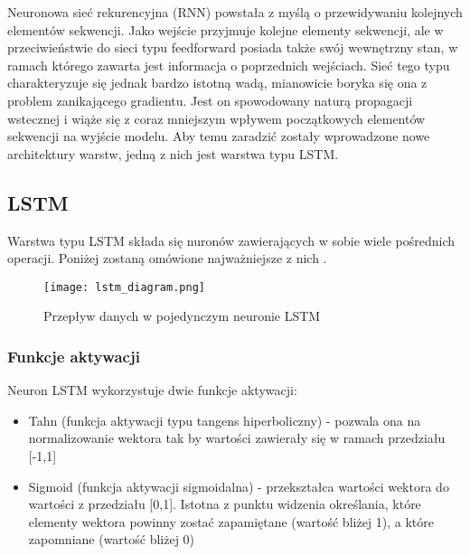 

Neuronowa sieć rekurencyjna (RNN) powstała z myślą o przewidywaniu kolejnych elementów sekwencji. Jako wejście przyjmuje kolejne elementy sekwencji, ale w przeciwieństwie do sieci typu feedforward posiada także swój wewnętrzny  stan, w ramach którego zawarta jest informacja o poprzednich wejściach. Sieć tego typu charakteryzuje się jednak bardzo istotną wadą, mianowicie boryka się ona z problem zanikającego gradientu. Jest on spowodowany naturą propagacji wstecznej i wiąże się z coraz mniejszym wpływem początkowych elementów sekwencji na wyjście modelu. Aby temu zaradzić zostały wprowadzone nowe architektury warstw, jedną z nich jest warstwa typu LSTM. \cite{RNN_1} \cite{RNN_2}




\subsection{\label{lstm_subsection}LSTM}




Warstwa typu LSTM składa się nuronów zawierających w sobie wiele pośrednich operacji. Poniżej zostaną omówione najważniejsze z nich \cite{LSTM_1}.

\begin{figure}[!h]
    \label{fig:lstm_diagram}
    \centering \texttt{[image: lstm\_diagram.png]}
    \caption{Przepływ danych w pojedynczym neuronie LSTM \cite{LSTM_1}}
\end{figure}




\subsubsection{Funkcje aktywacji}

\noindent Neuron LSTM wykorzystuje dwie funkcje aktywacji:

\begin{itemize}
    \item Tahn (funkcja aktywacji typu tangens hiperboliczny) - pozwala ona na normalizowanie wektora tak by wartości zawierały się w ramach przedziału [-1,1]
    \item Sigmoid (funkcja aktywacji sigmoidalna) - przekształca wartości wektora do wartości z przedziału [0,1]. Istotna z punktu widzenia określania, które elementy wektora powinny zostać zapamiętane (wartość bliżej 1), a które zapomniane (wartość bliżej 0)
\end{itemize}


